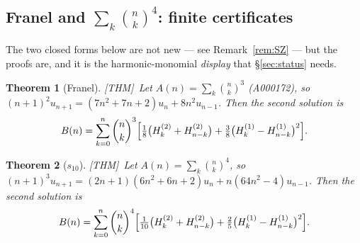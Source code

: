 \documentclass[11pt,reqno]{amsart}
\theoremstyle{plain}
\newtheorem{theorem}{Theorem}[section]
\theoremstyle{definition}
\theoremstyle{remark}
\newcommand{\bin}[2]{\binom{#1}{#2}}
\newcommand{\HH}[2]{H^{(#1)}_{#2}}
\newcommand{\Thm}{\textup{\textsf{[THM]}}}
\numberwithin{equation}{section}
\begin{document}
\subsection{Franel and $\sum_k\bin nk^4$: finite certificates}\label{sec:franel}

The two closed forms below are not new --- see Remark~\ref{rem:SZ} --- but the proofs are,
and it is the harmonic-monomial \emph{display} that \S\ref{sec:status} needs.

\begin{theorem}[Franel]\label{thm:franel}
\Thm\ Let $A(n)=\sum_k\bin nk^3$ (A000172), so $(n+1)^2u_{n+1}=(7n^2+7n+2)u_n+8n^2u_{n-1}$.
Then the second solution is
\[
  B(n)=\sum_{k=0}^n\bin nk^3\Bigl[\tfrac18\bigl(\HH2k+\HH2{n-k}\bigr)
        +\tfrac38\bigl(\HH1k-\HH1{n-k}\bigr)^2\Bigr].
\]
\end{theorem}

\begin{theorem}[$s_{10}$]\label{thm:s10}
\Thm\ Let $A(n)=\sum_k\bin nk^4$, so
$(n+1)^3u_{n+1}=(2n+1)(6n^2+6n+2)u_n+n(64n^2-4)u_{n-1}$. Then the second solution is
\[
  B(n)=\sum_{k=0}^n\bin nk^4\Bigl[\tfrac1{10}\bigl(\HH2k+\HH2{n-k}\bigr)
        +\tfrac25\bigl(\HH1k-\HH1{n-k}\bigr)^2\Bigr].
\]
\end{theorem}
\end{document}
